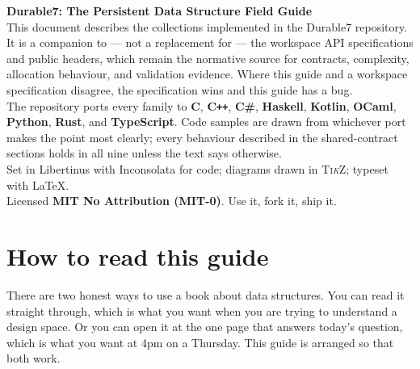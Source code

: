 \documentclass[11pt,twoside,openright]{book}
\begin{document}
\thispagestyle{empty}
\null\vfill
\begin{flushleft}\small\color{d7slate}
\textbf{\sffamily Durable7: The Persistent Data Structure Field Guide}\\[6pt]
This document describes the collections implemented in the Durable7 repository.
It is a companion to --- not a replacement for --- the workspace API
specifications and public headers, which remain the normative source for
contracts, complexity, allocation behaviour, and validation evidence.
Where this guide and a workspace specification disagree, the specification
wins and this guide has a bug.\\[10pt]
The repository ports every family to \textbf{C}, \textbf{C\texttt{++}},
\textbf{C\#}, \textbf{Haskell}, \textbf{Kotlin}, \textbf{OCaml},
\textbf{Python}, \textbf{Rust}, and \textbf{TypeScript}. Code samples are drawn
from whichever port makes the point most clearly; every behaviour described in
the shared-contract sections holds in all nine unless the text says
otherwise.\\[10pt]
Set in Libertinus with Inconsolata for code; diagrams drawn in \textsc{Ti\emph{k}Z};
typeset with \LaTeX.\\[10pt]
Licensed \textbf{MIT No Attribution (MIT-0)}. Use it, fork it, ship it.
\end{flushleft}
\vspace{18pt}

\cleardoublepage
\pagestyle{plain}
\setcounter{tocdepth}{1}
{\hypersetup{linkcolor=d7ink}
 \renewcommand{\contentsname}{Contents}
 \tableofcontents}

\cleardoublepage
\pagestyle{d7main}
\chapter*{How to read this guide}

There are two honest ways to use a book about data structures. You can read it
straight through, which is what you want when you are trying to understand a
design space. Or you can open it at the one page that answers today's question,
which is what you want at 4pm on a Thursday. This guide is arranged so that both
work.
\end{document}
